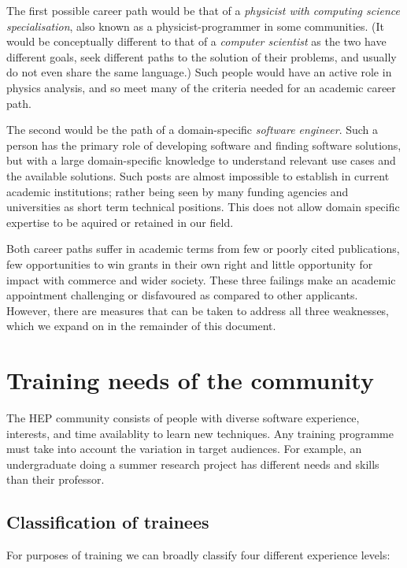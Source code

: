 \documentclass[12pt,a4paper]{article}
\begin{document}
The first possible career path would be that of a \emph{physicist with computing
science specialisation}, also known as a physicist-programmer in some
communities. (It would be conceptually different to that of a \emph{computer
scientist} as the two have different goals, seek different paths to the solution
of their problems, and usually do not even share the same language.) Such people
would have an active role in physics analysis, and so meet many of the criteria
needed for an academic career path.

The second would be the path of a domain-specific \emph{software
engineer}. Such a person has the primary role of developing software and finding
software solutions, but with a large domain-specific knowledge to
understand relevant use cases and the available solutions. 
Such posts are almost impossible to establish in current academic
institutions; rather being seen by many funding agencies and
universities as short term technical positions. This does not allow domain
specific expertise to be aquired or retained in our field.

Both career paths suffer in academic terms from few or poorly cited
publications, few opportunities to win grants in their own right and little
opportunity for impact with commerce and wider society. These three failings
make an academic appointment challenging or disfavoured as compared to other
applicants. However, there are measures that can be taken to address all three
weaknesses, which we expand on in the remainder of this document.

\section{Training needs of the community}

The HEP community consists of people with diverse software
experience, interests, and time availablity to learn new techniques.  Any
training programme must take into account the variation in target audiences. For
example, an undergraduate doing a summer research project has different needs
and skills than their professor.

\subsection{Classification of trainees}

For purposes of training we can broadly classify four
different experience levels:
\end{document}

